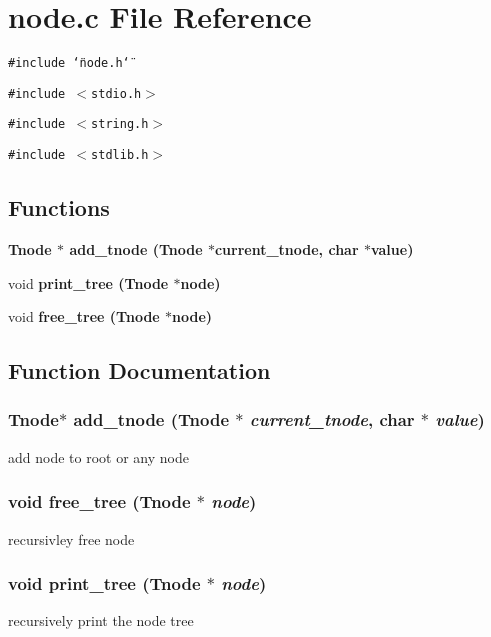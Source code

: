 \section{node.c File Reference}
\label{node_8c}
{\tt \#include \char`\"{}node.h\char`\"{}}\par
{\tt \#include $<$stdio.h$>$}\par
{\tt \#include $<$string.h$>$}\par
{\tt \#include $<$stdlib.h$>$}\par
\subsection*{Functions}
\begin{CompactItemize}
\item 
\bf{Tnode} $\ast$ \bf{add\_\-tnode} (\bf{Tnode} $\ast$current\_\-tnode, char $\ast$value)
\item 
void \bf{print\_\-tree} (\bf{Tnode} $\ast$node)
\item 
void \bf{free\_\-tree} (\bf{Tnode} $\ast$node)
\end{CompactItemize}


\subsection{Function Documentation}
\subsubsection{\setlength{\rightskip}{0pt plus 5cm}\bf{Tnode}$\ast$ add\_\-tnode (\bf{Tnode} $\ast$ {\em current\_\-tnode}, char $\ast$ {\em value})}\label{node_8c_0e09ab427d9f10182d2261a14b349f66}


add node to root or any node 
\subsubsection{\setlength{\rightskip}{0pt plus 5cm}void free\_\-tree (\bf{Tnode} $\ast$ {\em node})}\label{node_8c_76da80f6d3efba75651334442a1d63ee}


recursivley free node 
\subsubsection{\setlength{\rightskip}{0pt plus 5cm}void print\_\-tree (\bf{Tnode} $\ast$ {\em node})}\label{node_8c_243ce048ff7b497dd9f97f689d14e919}


recursively print the node tree 